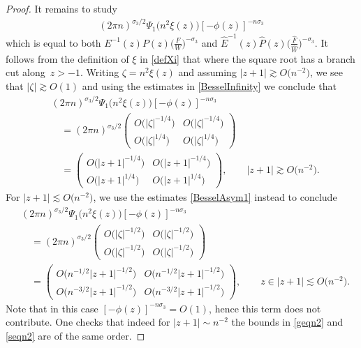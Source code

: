 \documentclass[11pt]{article}
\numberwithin{equation}{section}
\newcommand{\bP}{P}
\newcommand{\hP}{{\widehat P}}
\newcommand{\hF}{\widehat F}
\newcommand{\E}{\mathrm{e}}
\numberwithin{equation}{section}
\begin{document}
\begin{proof}
It remains to study
\begin{align*}
 (2\pi n)^{\sigma_3/2}\Psi_1\big(n^2 \xi(z)\big)[-\phi(z)]^{-n\sigma_3}
\end{align*}
which is equal to both $E^{-1}(z)\bP(z)\big(\frac{F}{W}\big)^{-\sigma_3}$ and $\widehat E^{-1}(z)\hP(z)\big(\frac{\hF}{\widehat W}\big)^{-\sigma_3}$. It follows from the definition of $\xi$ in \eqref{defXi} that \smash{$[-\phi(z)]^{-n\sigma_3} =\E^{-2\sqrt{n^2 \xi(z)}\sigma_3}$} where the square root has a branch cut along~$z > -1$. Writing $\zeta=n^2 \xi(z)$ and assuming $|z+1| \gtrsim O\big(n^{-2}\big)$, we see that $|\zeta| \gtrsim O(1)$ and using the estimates in \eqref{BesselInfinity} we conclude that
\begin{align}\nonumber
& (2\pi n)^{\sigma_3/2}\Psi_1\big(n^2 \xi(z)\big)[-\phi(z)]^{-n\sigma_3} \\
&\quad= (2\pi n)^{\sigma_3/2}\begin{pmatrix}
 O\big(|\zeta|^{-1/4}\big) & O\big(|\zeta|^{-1/4}\big)
 \\
 O\big(|\zeta|^{1/4}\big) & O\big(|\zeta|^{1/4}\big)
 \end{pmatrix}\nonumber
 \\
 &\quad=
 \begin{pmatrix}
 O\big(|z+1|^{-1/4}\big) & O\big(|z+1|^{-1/4}\big)
 \\
 O\big(|z+1|^{1/4}\big) & O\big(|z+1|^{1/4}\big)
 \end{pmatrix}, \qquad |z+1| \gtrsim O\big(n^{-2}\big).\label{geqn2}
\end{align}
For $|z+1| \lesssim O\big(n^{-2}\big)$, we use the estimates \eqref{BesselAsym1} instead to conclude
\begin{align}
 &(2\pi n)^{\sigma_3/2}\Psi_1\big(n^2 \xi(z)\big)[-\phi(z)]^{-n\sigma_3} \nonumber\\
 &\quad= (2\pi n)^{\sigma_3/2}\begin{pmatrix}
 O\big(|\zeta|^{-1/2}\big) & O\big(|\zeta|^{-1/2}\big)
 \\
 O\big(|\zeta|^{-1/2}\big) & O\big(|\zeta|^{-1/2}\big)
 \end{pmatrix}\nonumber\\
&\quad= \begin{pmatrix}
 O\big(n^{-1/2}|z+1|^{-1/2}\big) & O\big(n^{-1/2}|z+1|^{-1/2}\big)
 \\
 O\big(n^{-3/2}|z+1|^{-1/2}\big) & O\big(n^{-3/2}|z+1|^{-1/2}\big)
 \end{pmatrix}, \qquad z \in |z+1| \lesssim O\big(n^{-2}\big).\label{seqn2}
\end{align}
Note that in this case $[-\phi(z)]^{-n\sigma_3} = O(1)$, hence this term does not contribute. One checks that indeed for $|z+1| \sim n^{-2}$ the bounds in \eqref{geqn2} and \eqref{seqn2} are of the same order.


\end{proof}
\end{document}

